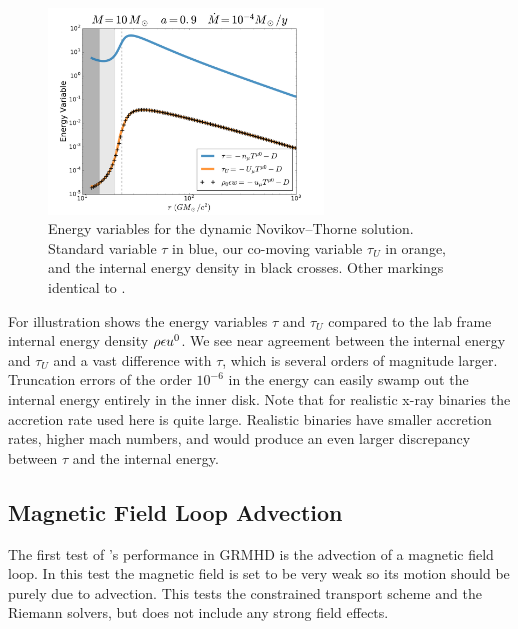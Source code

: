 \begin{figure}
\begin{center}
	\includegraphics[width=0.65\textwidth]{figures/numerics/nt_eps.pdf}
\end{center}
\caption{Energy variables for the dynamic Novikov--Thorne solution. Standard variable $\tau$ in blue, our co-moving variable $\tau_U$ in orange, and the internal energy density in black crosses.  Other markings identical to .  }
\end{figure}

For illustration  shows the energy variables $\tau$ and $\tau_U$ compared to the lab frame internal energy density $\rho \epsilon u^0$.  We see near agreement between the internal energy and $\tau_U$ and a vast difference with $\tau$, which is several orders of magnitude larger.  Truncation errors of the order $10^{-6}$ in the energy can easily swamp out the internal energy entirely in the inner disk.  Note that for realistic x-ray binaries the accretion rate used here is quite large.  Realistic binaries have smaller accretion rates, higher mach numbers, and would produce an even larger discrepancy between $\tau$ and the internal energy.  

\subsection{Magnetic Field Loop Advection}

The first test of \grdisco's performance in GRMHD is the advection of a magnetic field loop.  In this test the magnetic field is set to be very weak so its motion should be purely due to advection.  This tests the constrained transport scheme and the Riemann solvers, but does not include any strong field effects.

